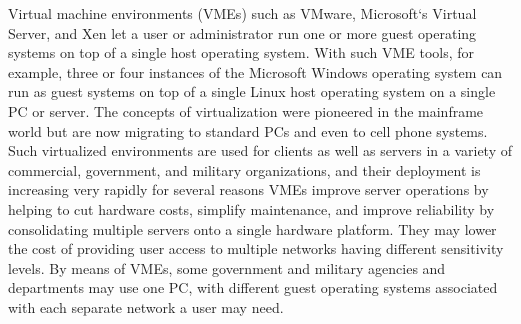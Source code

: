 \documentclass[11pt,a4paper]{article}
\begin{document}
	Virtual machine environments (VMEs) such as
VMware, Microsoft‘s Virtual Server, and Xen let a user or administrator run one or more guest operating systems on top of a single host operating system. With
such VME tools, for example, three or four instances of the Microsoft Windows operating system can run as guest systems on top of a single Linux host operating
system on a single PC or server. The concepts of virtualization were pioneered in the mainframe world but are now migrating to standard PCs and even to cell
phone systems. Such virtualized environments are used for clients as well as servers in a variety of commercial, government, and military organizations, and their deployment is increasing very rapidly for several reasons VMEs improve server operations by helping to cut hardware costs, simplify maintenance, and improve reliability by consolidating multiple servers onto a single hardware platform. They may lower the cost of providing user access to multiple networks having different sensitivity levels. By means of VMEs, some government and military agencies and departments may use one PC, with different guest operating systems associated with each separate network a user may need.
\end{document}
